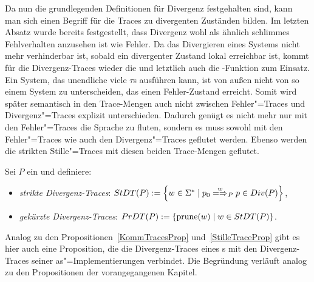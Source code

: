Da nun die grundlegenden Definitionen für Divergenz festgehalten sind, kann man
sich einen Begriff für die Traces zu divergenten Zuständen bilden. Im letzten
Absatz wurde bereits festgestellt, dass Divergenz wohl als ähnlich \glqq
schlimmes\grqq{} Fehlverhalten anzusehen ist wie Fehler. Da das Divergieren
eines Systems nicht mehr verhinderbar ist, sobald ein divergenter Zustand lokal
erreichbar ist, kommt für die Divergenz-Traces wieder die \prune{} und
letztlich auch die \cont{}-Funktion zum Einsatz. Ein System, das unendliche
viele $\tau$s ausführen kann, ist von außen nicht von so einem System zu
unterscheiden, das einen Fehler-Zustand erreicht. Somit wird später semantisch
in den Trace-Mengen auch nicht zwischen Fehler"=Traces und Divergenz"=Traces
explizit unterschieden. Dadurch genügt es nicht mehr nur mit den Fehler"=Traces
die Sprache zu fluten, sondern es muss sowohl mit den Fehler"=Traces wie auch
den Divergenz"=Traces geflutet werden. Ebenso werden die strikten
Stille"=Traces mit diesen beiden Trace-Mengen geflutet.

\begin{Def}
  Sei $P$ ein \MEIO{} und definiere:
  \begin{itemize}
    \item \emph{strikte Divergenz-Traces}: $\StDT (P) := \left\{w\in\Sigma
      ^*\mid p_0\weakmay[w]_P p\in Div(P)\right\}$,
    \item \emph{gekürzte Divergenz-Traces}: $PrDT (P) := \left\{\mathrm{prune} (w)\mid
      w\in StDT (P)\right\}$.
  \end{itemize}
\end{Def}

Analog zu den Propositionen~\ref{KommTracesProp} und~\ref{StilleTraceProp} gibt
es hier auch eine Proposition, die die Divergenz-Traces eines \MEIO{}s mit den
Divergenz-Traces seiner as"=Implementierungen verbindet. Die Begründung
verläuft analog zu den Propositionen der vorangegangenen Kapitel.

